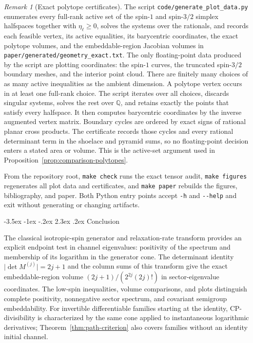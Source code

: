 \documentclass[twoside,10pt]{article}
\makeatletter
\numberwithin{equation}{section}
\theoremstyle{slbody}
\theoremstyle{definition}
\theoremstyle{remark}
\newtheorem{remark}[theorem]{Remark}
\renewcommand{\section}{%
  \@startsection{section}{1}{\z@}%
    {-3.5ex \@plus -1ex \@minus -.2ex}%
    {2.3ex \@plus .2ex}%
    {\normalfont\large\bfseries}}
\makeatother
\begin{document}
\begin{remark}[Exact polytope certificates]
The script \texttt{code/generate\_plot\_data.py} enumerates every
full-rank active set of the spin-\(1\) and spin-\(3/2\) simplex
halfspaces together with \(\eta_\ell\geq0\), solves the systems over
the rationals, and records each feasible vertex, its active equalities,
its barycentric coordinates, the exact polytope volumes, and the
embeddable-region Jacobian volumes in
\texttt{paper/generated/geometry\_exact.txt}.
The only floating-point data produced by the script are plotting
coordinates: the spin-\(1\) curves, the truncated spin-\(3/2\)
boundary meshes, and the interior point cloud.
There are finitely many choices of as many active inequalities as the
ambient dimension.  A polytope vertex occurs in at least one full-rank
choice.  The script iterates over all choices, discards singular systems,
solves the rest over \(\mathbb Q\), and retains exactly the points that
satisfy every halfspace.  It then computes barycentric coordinates by
the inverse augmented vertex matrix.  Boundary cycles are ordered by
exact signs of rational planar cross products.  The certificate records
those cycles and every rational determinant term in the shoelace and
pyramid sums, so no floating-point decision enters a stated area or
volume.  This is the active-set argument used in
Proposition~\ref{prop:comparison-polytopes}.
\end{remark}

From the repository root, \texttt{make check} runs the exact tensor
audit, \texttt{make figures} regenerates all plot data and certificates,
and \texttt{make paper} rebuilds the figures, bibliography, and paper.
Both Python entry points accept \verb|-h| and \verb|--help| and exit
without generating or changing artifacts.

\section{Conclusion}

The classical isotropic-spin generator and relaxation-rate transform
provides an explicit endpoint test in channel eigenvalues: positivity of
the spectrum and membership of its logarithm in the generator cone.
The determinant identity \(\lvert\det M^{(j)}\rvert=2j+1\) and the
column sums of this transform give the exact embeddable-region volume
\((2j+1)/(2^{2j}(2j)!)\) in sector-eigenvalue coordinates.
The low-spin inequalities, volume comparisons, and plots distinguish
complete positivity, nonnegative sector spectrum, and covariant
semigroup embeddability.  For invertible differentiable families starting
at the identity, CP-divisibility is characterized by the same cone
applied to instantaneous logarithmic derivatives; Theorem~\ref{thm:path-criterion}
also covers families without an identity initial channel.
\end{document}
